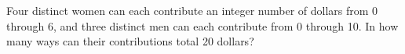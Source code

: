 Four distinct women can each contribute an integer number of dollars from 0 through 6, and three distinct men can each contribute from 0 through 10. In how many ways can their contributions total 20 dollars?
